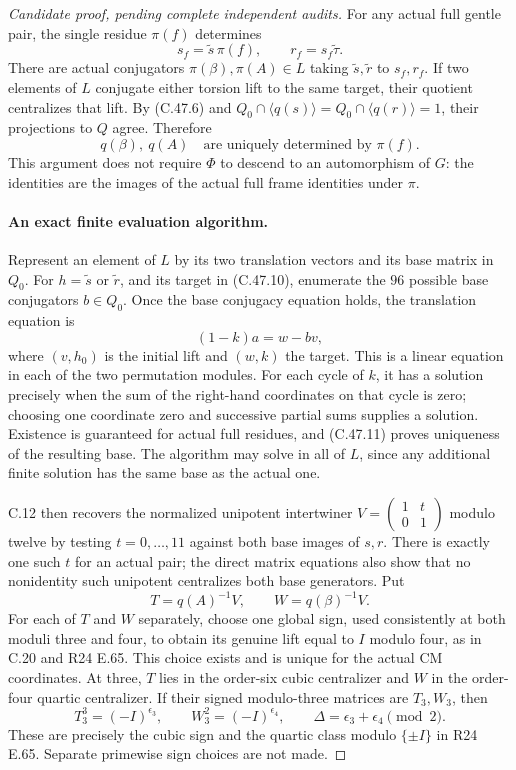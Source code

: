 \begin{proof}[Candidate proof, pending complete independent audits]
For any actual full gentle pair, the single residue $\pi(f)$
determines
\[
 s_f=\widetilde s\,\pi(f),\qquad
 r_f=s_f\widetilde\tau.                              \tag{C.47.10}
\]
There are actual conjugators $\pi(\beta),\pi(A)\in L$ taking
$\widetilde s,\widetilde r$ to $s_f,r_f$. If two elements of
$L$ conjugate either torsion lift to the same target, their quotient
centralizes that lift. By (C.47.6) and
$Q_0\cap\langle q(s)\rangle=Q_0\cap\langle q(r)\rangle=1$,
their projections to $Q$ agree. Therefore
\[
                       q(\beta),\ q(A)
       \quad\text{are uniquely determined by }\pi(f).           \tag{C.47.11}
\]
This argument does not require $\Phi$ to descend to an automorphism
of $G$: the identities are the images of the actual full frame
identities under $\pi$.

\paragraph{An exact finite evaluation algorithm.}
Represent an element of $L$ by its two translation vectors and
its base matrix in $Q_0$. For $h=\widetilde s$ or
$\widetilde r$, and its target in (C.47.10), enumerate the
$96$ possible base conjugators $b\in Q_0$. Once the base
conjugacy equation holds, the translation equation is
\[
           (1-k)a=w-bv,                              \tag{C.47.12}
\]
where $(v,h_0)$ is the initial lift and $(w,k)$ the target.
This is a linear equation in each of the two permutation modules.
For each cycle of $k$, it has a solution precisely when the sum
of the right-hand coordinates on that cycle is zero; choosing one
coordinate zero and successive partial sums supplies a solution.
Existence is guaranteed for actual full residues, and (C.47.11)
proves uniqueness of the resulting base. The algorithm may solve
in all of $L$, since any additional finite solution has the same
base as the actual one.

C.12 then recovers the normalized unipotent intertwiner
$V=\left(\begin{smallmatrix}1&t\\0&1\end{smallmatrix}\right)$
modulo twelve by testing $t=0,\ldots,11$ against both base images
of $s,r$. There is exactly one such $t$ for an actual pair;
the direct matrix equations also show that no nonidentity such
unipotent centralizes both base generators. Put
\[
                      T=q(A)^{-1}V,\qquad
                      W=q(\beta)^{-1}V.             \tag{C.47.13}
\]
For each of $T$ and $W$ separately, choose one global sign,
used consistently at both moduli three and four, to obtain its
genuine lift equal to $I$ modulo four, as in C.20 and
R24 E.65. This choice exists and is unique for the actual CM
coordinates. At three, $T$ lies in the order-six cubic centralizer
and $W$ in the order-four quartic centralizer. If their signed
modulo-three matrices are $T_3,W_3$, then
\[
 T_3^3=(-I)^{\epsilon_3},\qquad
 W_3^2=(-I)^{\epsilon_4},\qquad
             \Delta=\epsilon_3+\epsilon_4\pmod2.     \tag{C.47.14}
\]
These are precisely the cubic sign and the quartic class modulo
$\{\pm I\}$ in R24 E.65. Separate primewise sign choices are
not made.


\end{proof}
